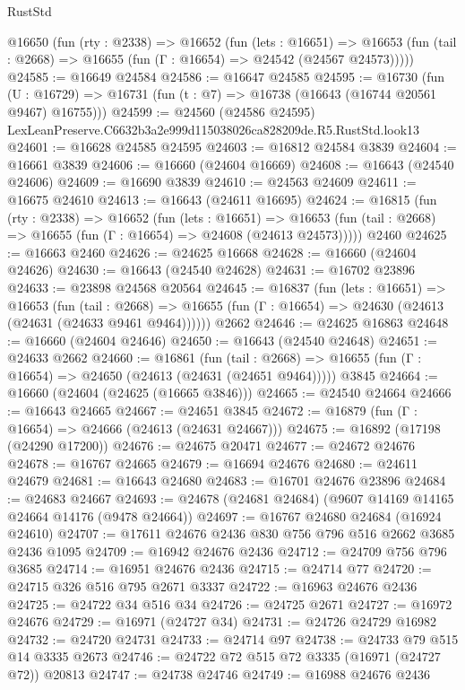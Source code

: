 \begin{lexlean}{RustStd}
\begin{coremodule}
  @16650
    (fun (rty : @2338) =>
    @16652
      (fun (lets : @16651) =>
      @16653 (fun (tail : @2668) => @16655 (fun (Γ : @16654) => @24542 (@24567 @24573)))))
@24585 := @16649 @24584
@24586 := @16647 @24585
@24595 := @16730
    (fun (U : @16729) => @16731 (fun (t : @7) => @16738 (@16643 (@16744 @20561 @9467) @16755)))
@24599 := @24560 (@24586 @24595) LexLeanPreserve.C6632b3a2e999d115038026ca828209de.R5.RustStd.look13
@24601 := @16628 @24585 @24595
@24603 := @16812 @24584 @3839
@24604 := @16661 @3839
@24606 := @16660 (@24604 @16669)
@24608 := @16643 (@24540 @24606)
@24609 := @16690 @3839
@24610 := @24563 @24609
@24611 := @16675 @24610
@24613 := @16643 (@24611 @16695)
@24624 := @16815
    (fun (rty : @2338) =>
    @16652
      (fun (lets : @16651) =>
      @16653 (fun (tail : @2668) => @16655 (fun (Γ : @16654) => @24608 (@24613 @24573)))))
    @2460
@24625 := @16663 @2460
@24626 := @24625 @16668
@24628 := @16660 (@24604 @24626)
@24630 := @16643 (@24540 @24628)
@24631 := @16702 @23896
@24633 := @23898 @24568 @20564
@24645 := @16837
    (fun (lets : @16651) =>
    @16653
      (fun (tail : @2668) =>
      @16655 (fun (Γ : @16654) => @24630 (@24613 (@24631 (@24633 @9461 @9464))))))
    @2662
@24646 := @24625 @16863
@24648 := @16660 (@24604 @24646)
@24650 := @16643 (@24540 @24648)
@24651 := @24633 @2662
@24660 := @16861
    (fun (tail : @2668) => @16655 (fun (Γ : @16654) => @24650 (@24613 (@24631 (@24651 @9464)))))
    @3845
@24664 := @16660 (@24604 (@24625 (@16665 @3846)))
@24665 := @24540 @24664
@24666 := @16643 @24665
@24667 := @24651 @3845
@24672 := @16879 (fun (Γ : @16654) => @24666 (@24613 (@24631 @24667)))
@24675 := @16892 (@17198 (@24290 @17200))
@24676 := @24675 @20471
@24677 := @24672 @24676
@24678 := @16767 @24665
@24679 := @16694 @24676
@24680 := @24611 @24679
@24681 := @16643 @24680
@24683 := @16701 @24676 @23896
@24684 := @24683 @24667
@24693 := @24678 (@24681 @24684) (@9607 @14169 @14165 @24664 @14176 (@9478 @24664))
@24697 := @16767 @24680 @24684 (@16924 @24610)
@24707 := @17611 @24676 @2436 @830 @756 @796 @516 @2662 @3685 @2436 @1095
@24709 := @16942 @24676 @2436
@24712 := @24709 @756 @796 @3685
@24714 := @16951 @24676 @2436
@24715 := @24714 @77
@24720 := @24715 @326 @516 @795 @2671 @3337
@24722 := @16963 @24676 @2436
@24725 := @24722 @34 @516 @34
@24726 := @24725 @2671
@24727 := @16972 @24676
@24729 := @16971 (@24727 @34)
@24731 := @24726 @24729 @16982
@24732 := @24720 @24731
@24733 := @24714 @97
@24738 := @24733 @79 @515 @14 @3335 @2673
@24746 := @24722 @72 @515 @72 @3335 (@16971 (@24727 @72)) @20813
@24747 := @24738 @24746
@24749 := @16988 @24676 @2436

\end{coremodule}
\end{lexlean}
